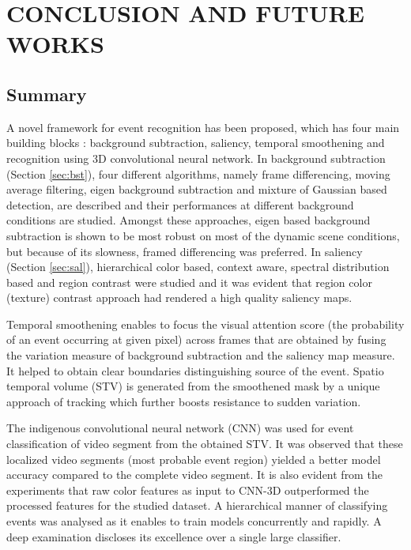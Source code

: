 \chapter{CONCLUSION AND FUTURE WORKS}
\label{chap:concl}

\section{Summary}
A novel framework for event recognition has been proposed, which has four main building blocks : background subtraction, saliency, temporal smoothening and recognition using 3D convolutional neural network.  In background subtraction (Section \ref{sec:bst}), four different algorithms, namely frame differencing, moving average filtering, eigen background subtraction and mixture of Gaussian based detection, are described and their performances at different background conditions are studied.  Amongst these approaches, eigen based background subtraction is shown to be most robust on most of the dynamic scene conditions, but because of its slowness, framed differencing was preferred.  In saliency (Section \ref{sec:sal}), hierarchical color based, context aware, spectral distribution based and region contrast were studied and it was evident that region color (texture) contrast approach had rendered a high quality saliency maps.

\par Temporal smoothening enables to focus the visual attention score (the probability of an event occurring at given pixel) across frames that are obtained by fusing the variation measure of background subtraction and the saliency map measure.  It helped to obtain clear boundaries distinguishing source of the event.  Spatio temporal volume (STV) is generated from the smoothened mask by a unique approach of tracking which further boosts resistance to sudden variation.

\par The indigenous convolutional neural network (CNN) was used for event classification of video segment from the  obtained STV.  It was observed that these localized video segments (most probable event region) yielded a better model accuracy compared to the complete video segment.  It is also evident from the experiments that raw color features as input to CNN-3D outperformed the processed features for the studied dataset.  A hierarchical manner of classifying events was analysed as it enables to train models concurrently and rapidly.  A deep examination discloses its excellence over a single large classifier.

